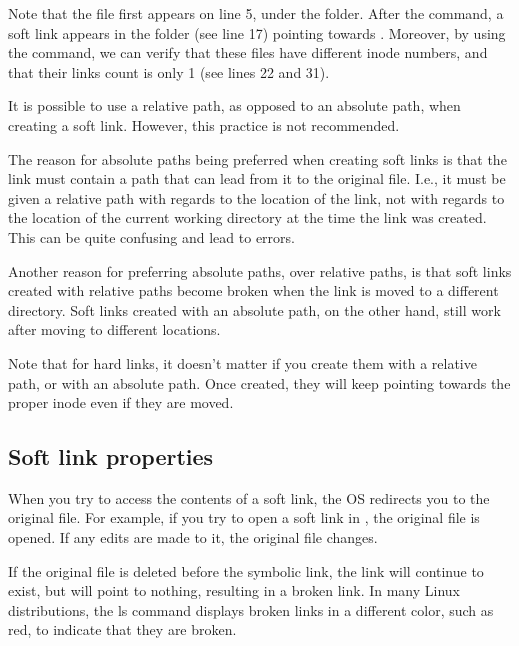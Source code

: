 Note that the file  first appears on line 5, under the  folder. After the  command, a soft link  appears in the  folder (see line 17)  pointing towards . Moreover, by using the  command, we can verify that these files have different inode numbers, and that their links count is only 1 (see lines 22 and 31).

\begin{my_box}
It is possible to use a relative path, as opposed to an absolute path, when creating a soft link. However, this practice is not recommended.

The reason for absolute paths being preferred when creating soft links is that the link must contain a path that can lead from it to the original file. I.e., it must be given a relative path with regards to the location of the link, not with regards to the location of the current working directory at the time the link was created. This can be quite confusing and lead to errors.

Another reason for preferring absolute paths, over relative paths, is that soft links created with relative paths become broken when the link is moved to a different directory. Soft links created with an absolute path, on the other hand, still work after moving to different locations.

Note that for hard links, it doesn't matter if you create them with a relative path, or with an absolute path. Once created, they will keep pointing towards the proper inode even if they are moved.
\end{my_box}

\subsection{Soft link properties}

When you try to access the contents of a soft link, the \acs{OS} redirects you to the original file. For  example,  if  you try to open a soft link in , the original file is opened. If any edits are made to it, the original file changes.

If the original file is deleted before the symbolic link, the link  will  continue to  exist, but will point to nothing, resulting in a broken link. In many Linux distributions, the ls command displays broken links in a different color, such as red, to indicate that they are broken.

